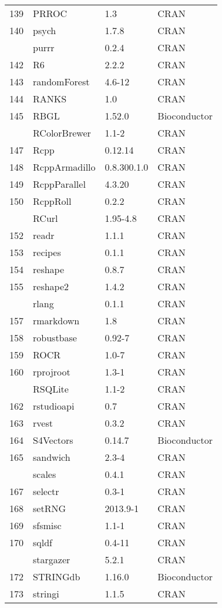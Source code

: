 \begin{longtable}{rlll}
139 & PRROC & 1.3 & CRAN\\
140 & psych & 1.7.8 & CRAN\\
\addlinespace
141 & purrr & 0.2.4 & CRAN\\
142 & R6 & 2.2.2 & CRAN\\
143 & randomForest & 4.6-12 & CRAN\\
144 & RANKS & 1.0 & CRAN\\
145 & RBGL & 1.52.0 & Bioconductor\\
\addlinespace
146 & RColorBrewer & 1.1-2 & CRAN\\
147 & Rcpp & 0.12.14 & CRAN\\
148 & RcppArmadillo & 0.8.300.1.0 & CRAN\\
149 & RcppParallel & 4.3.20 & CRAN\\
150 & RcppRoll & 0.2.2 & CRAN\\
\addlinespace
151 & RCurl & 1.95-4.8 & CRAN\\
152 & readr & 1.1.1 & CRAN\\
153 & recipes & 0.1.1 & CRAN\\
154 & reshape & 0.8.7 & CRAN\\
155 & reshape2 & 1.4.2 & CRAN\\
\addlinespace
156 & rlang & 0.1.1 & CRAN\\
157 & rmarkdown & 1.8 & CRAN\\
158 & robustbase & 0.92-7 & CRAN\\
159 & ROCR & 1.0-7 & CRAN\\
160 & rprojroot & 1.3-1 & CRAN\\
\addlinespace
161 & RSQLite & 1.1-2 & CRAN\\
162 & rstudioapi & 0.7 & CRAN\\
163 & rvest & 0.3.2 & CRAN\\
164 & S4Vectors & 0.14.7 & Bioconductor\\
165 & sandwich & 2.3-4 & CRAN\\
\addlinespace
166 & scales & 0.4.1 & CRAN\\
167 & selectr & 0.3-1 & CRAN\\
168 & setRNG & 2013.9-1 & CRAN\\
169 & sfsmisc & 1.1-1 & CRAN\\
170 & sqldf & 0.4-11 & CRAN\\
\addlinespace
171 & stargazer & 5.2.1 & CRAN\\
172 & STRINGdb & 1.16.0 & Bioconductor\\
173 & stringi & 1.1.5 & CRAN\\

\end{longtable}
